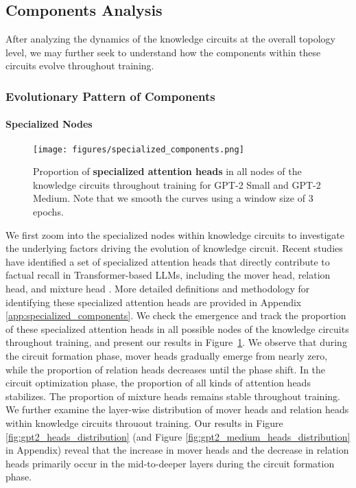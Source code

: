 \subsection{Components Analysis}
\label{sec:components}

After analyzing the dynamics of the knowledge circuits at the overall topology level, we may further seek to understand how the components within these circuits evolve throughout training.

\subsubsection{Evolutionary Pattern of Components}
\label{sec:evolutionary_pattern}

\paragraph{Specialized Nodes}

\begin{figure}
    \centering
    \texttt{[image: figures/specialized\_components.png]}
    \caption{Proportion of \textbf{specialized attention heads} in all nodes of the knowledge circuits throughout training for GPT-2 Small and GPT-2 Medium. Note that we smooth the curves using a window size of 3 epochs.}
    \label{fig:specialized_components}
    \vspace{-10pt}
\end{figure}

We first zoom into the specialized nodes within knowledge circuits to investigate the underlying factors driving the evolution of knowledge circuit.
Recent studies have identified a set of specialized attention heads \citep{attention_heads_survey,mi_primer} that directly contribute to factual recall in Transformer-based LLMs, including the mover head, relation head, and mixture head \citep{DBLP:journals/corr/abs-2403-19521,DBLP:conf/iclr/MerulloEP24,additive_mechanisms}.
More detailed definitions and methodology for identifying these specialized attention heads are provided in Appendix \ref{app:specialized_components}.
We check the emergence and track the proportion of these specialized attention heads in all possible nodes of the knowledge circuits throughout training, and present our results in Figure~\ref{fig:specialized_components}.
We observe that during the circuit formation phase, mover heads gradually emerge from nearly zero, while the proportion of relation heads decreases until the phase shift.
In the circuit optimization phase, the proportion of all kinds of attention heads stabilizes.
The proportion of mixture heads remains stable throughout training.
We further examine the layer-wise distribution of mover heads and relation heads within knowledge circuits throuout training.
Our results in Figure \ref{fig:gpt2_heads_distribution} (and Figure \ref{fig:gpt2_medium_heads_distribution} in Appendix) reveal that the increase in mover heads and the decrease in relation heads primarily occur in the mid-to-deeper layers during the circuit formation phase.

